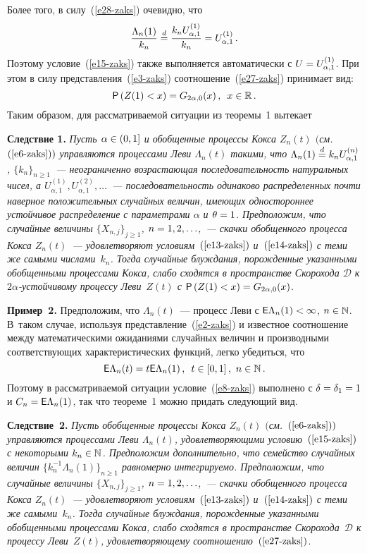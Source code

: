 \begin{multicols}{2}
Более того, в силу~(\ref{e28-zaks}) очевидно, что
$$
\displaystyle\frac{\displaystyle \Lambda_n(1)\mathstrut}{\displaystyle k_n\mathstrut}\stackrel{d}{=} \displaystyle\frac{\displaystyle k_nU^{(1)}_{\alpha,1}\mathstrut}{\displaystyle k_n\mathstrut}=U^{(1)}_{\alpha,1}\,.
$$
Поэтому условие~(\ref{e15-zaks}) также выполняется автоматически с
$U\hm=U^{(1)}_{\alpha,1}$. При этом в силу представления~(\ref{e3-zaks})
соотношение~(\ref{e27-zaks}) принимает вид:
$$
{\sf P}\left(Z(1)<x\right)=G_{2\alpha,0}(x)\,,\enskip x\in\mathbb{R}\,.
$$
Таким образом, для рассматриваемой ситуации из теоремы~1 вытекает

\smallskip

\noindent
\textbf{Следствие 1.} \textit{Пусть $\alpha\hm\in(0,1]$ и обобщенные процессы
Кокса $Z_n(t)$ $($см.~$(\ref{e6-zaks}))$ управляются процессами Леви\linebreak
$\Lambda_n(t)$ такими, что $\Lambda_n(1)\stackrel{d}{=} k_nU_{\alpha,1}^{(n)}$,
$\{k_n\}_{n\geqslant1}$~--- неограниченно возрастающая последовательность
натуральных чисел, а $U^{(1)}_{\alpha,1},U^{(2)}_{\alpha,1},\ldots$~---
последовательность одинаково распределенных почти наверное
положитель\-ных случайных величин, имеющих одностороннее устойчивое
распределение с параметрами $\alpha$ и $\theta\hm=1$. Предположим, что
случайные величины $\{X_{n,j}\}_{j\geqslant1}$, $n\hm=1,2,\ldots$,~--- скачки
обобщенного процесса Кокса $Z_n(t)$~--- удовлетворяют условиям~$(\ref{e13-zaks})$
и~$(\ref{e14-zaks})$ с теми же самыми числами~$k_n$. Тогда случайные блуждания,
порожденные указанными обобщенными процессами Кокса, слабо сходятся
в пространстве Скорохода $\mathcal{D}$ к $2\alpha$-устой\-чи\-во\-му
процессу Леви~$Z(t)$ с ${\sf P}\left(Z(1)\hm<x\right)\hm=G_{2\alpha,0}(x)$.}

\smallskip

\noindent
\textbf{Пример~2.} Предположим, что $\Lambda_n(t)$~--- процесс Леви с
${\sf E}\Lambda_n(1)\hm<\infty$, $n\hm\in\mathbb{N}$. В~таком случае,
используя представление~(\ref{e2-zaks}) и известное соотношение между
математическими ожиданиями случайных величин и производными
соответствующих характеристических функций, легко убедиться, что
$$
{\sf E}\Lambda_n(t)=t{\sf E}\Lambda_n(1)\,, \enskip t\in[0,1]\,,\
n\in\mathbb{N}\,.
$$
Поэтому в рассматриваемой ситуации условие~(\ref{e8-zaks}) выполнено с
$\delta\hm=\delta_1\hm=1$ и $C_n\hm={\sf E}\Lambda_n(1)$, так что теореме~1
можно придать следующий вид.

\smallskip

\noindent
\textbf{Следствие~2.} \textit{Пусть обобщенные процессы Кокса $Z_n(t)$
$($см.~$(\ref{e6-zaks}))$ управляются процессами Леви $\Lambda_n(t)$,
удовлетворяющими условию~$(\ref{e15-zaks})$ с некоторыми $k_n\hm\in\mathbb{N}$.
Предположим дополнительно, что семейство случайных величин
$\{k_n^{-1}\Lambda_n(1)\}_{n\geqslant1}$ равномерно интегрируемо.
Предположим, что случайные величины $\{X_{n,j}\}_{j\geqslant1}$,
$n\hm=1,2,\ldots$,~--- скачки обобщенного процесса Кокса $Z_n(t)$~---
удовлетворяют условиям~$(\ref{e13-zaks})$ и~$(\ref{e14-zaks})$ с теми же самыми~$k_n$. Тогда
случайные блуж\-да\-ния, порожденные указанными обобщенными процессами
Кокса, слабо сходятся в пространстве Скорохода~$\mathcal{D}$ к
процессу Леви~$Z(t)$, удовлетворяющему соотношению~$(\ref{e27-zaks})$.}


\end{multicols}
